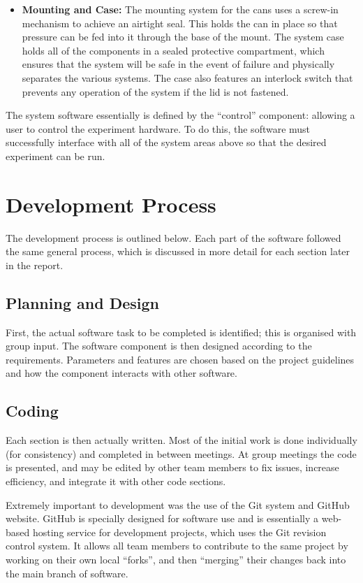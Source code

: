 \begin{itemize}
	\item {\bf Mounting and Case:} The mounting system for the cans uses a screw-in mechanism to achieve an airtight seal. This holds the can in place so that pressure can be fed into it through the base of the mount. The system case holds all of the components in a sealed protective compartment, which ensures that the system will be safe in the event of failure and physically separates the various systems. The case also features an interlock switch that prevents any operation of the system if the lid is not fastened.

\end{itemize}

The system software essentially is defined by the “control” component: allowing a user to control the experiment hardware. To do this, the software must successfully interface with all of the system areas above so that the desired experiment can be run. 

\section{Development Process}

The development process is outlined below. Each part of the software followed the same general process, which is discussed in more detail for each section later in the report.

\subsection{Planning and Design}
First, the actual software task to be completed is identified; this is organised with group input. The software component is then designed according to the requirements. Parameters and features are chosen based on the project guidelines and how the component interacts with other software. 

\subsection{Coding}

Each section is then actually written. Most of the initial work is done individually (for consistency) and completed in between meetings. At group meetings the code is presented, and may be edited by other team members to fix issues, increase efficiency, and integrate it with other code sections.


Extremely important to development was the use of the Git system and GitHub website. GitHub is specially designed for software use and is essentially a web-based hosting service for development projects, which uses the Git revision control system. It allows all team members to contribute to the same project by working on their own local “forks”, and then “merging” their changes back into the main branch of software\cite{github_fork}.

